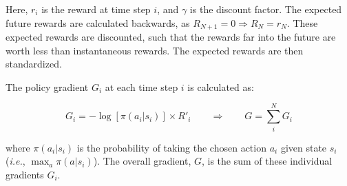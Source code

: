 \documentclass{article}
\renewenvironment{leftbar}[1][\hsize]{
    \def\FrameCommand{{\color{barcolor}\vrule width 0.5pt \hspace{10pt}}}
    \MakeFramed{\hsize#1 \advance\hsize-\width \FrameRestore}
}{\endMakeFramed}
\begin{document}
\begin{leftbar}
    Here, $r_i$ is the reward at time step $i$, and $\gamma$ is the discount factor. The expected future rewards are calculated backwards, as $R_{N+1} = 0 \Rightarrow R_N = r_N$. These expected rewards are discounted, such that the rewards far into the future are worth less than instantaneous rewards. The expected rewards are then standardized.

    The policy gradient $G_i$ at each time step $i$ is calculated as:

    \begin{equation}
        G_i = - \log \left[ \pi(a_i|s_i) \right] \times R'_i \qquad \Rightarrow \qquad G = \sum_{i}^N G_i
    \end{equation}

    where $\pi(a_i|s_i)$ is the probability of taking the chosen action $a_i$ given state $s_i$ (\textit{i.e.}, $\max_{a} \pi (a|s_i)$). The overall gradient, $G$, is the sum of these individual gradients $G_i$.

\end{leftbar}
\end{document}
